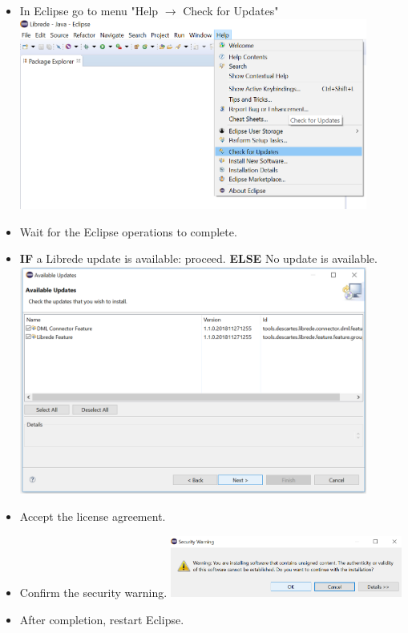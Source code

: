\begin{itemize}
	\item In Eclipse go to menu "Help $ \rightarrow $ Check for Updates" \newline
			\newline
			\includegraphics[width=0.9\textwidth]{screenshots/Screenshot7}
	\item Wait for the Eclipse operations to complete. 
	\item \textbf{IF} a Librede update is available: proceed. \textbf{ELSE} No update is available. \newline
			\newline
			\includegraphics[width=0.9\textwidth]{screenshots/Screenshot8}
			
	\item Accept the license agreement.
	\item Confirm the security warning. \newline
				\newline
				\includegraphics[width=0.6\textwidth]{screenshots/Screenshot6}	
	\item After completion, restart Eclipse. \newline
	
\end{itemize}

